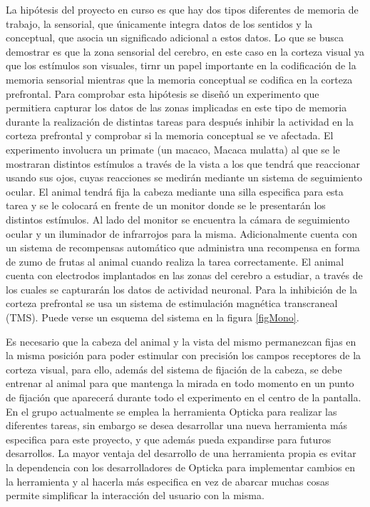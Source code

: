 \documentclass[conference]{IEEEtran}
\begin{document}
La hipótesis del proyecto en curso es que hay dos tipos diferentes de memoria de trabajo, la sensorial, que únicamente integra datos de los sentidos y la conceptual, que asocia un significado adicional a estos datos. Lo que se busca demostrar es que la zona sensorial del cerebro, en este caso en la corteza visual ya que los estímulos son visuales, tirnr un papel importante en la codificación de la memoria sensorial mientras que la memoria conceptual se codifica en la corteza prefrontal.
Para comprobar esta hipótesis se diseñó un experimento que permitiera capturar los datos de las zonas implicadas en este tipo de memoria durante la realización de distintas tareas para después inhibir la actividad en la corteza prefrontal y comprobar si la memoria conceptual se ve afectada.
El experimento involucra un primate (un macaco, Macaca mulatta) al que se le mostraran distintos estímulos a través de la vista a los que tendrá que reaccionar usando sus ojos, cuyas reacciones se medirán mediante un sistema de seguimiento ocular. El animal tendrá fija la cabeza mediante una silla especifica para esta tarea y se le colocará en frente de un monitor donde se le presentarán los distintos estímulos. Al lado del monitor se encuentra la cámara de seguimiento ocular y un iluminador de infrarrojos para la misma. Adicionalmente cuenta con un sistema de recompensas automático que administra una recompensa en forma de zumo de frutas al animal cuando realiza la tarea correctamente. El animal cuenta con electrodos implantados en las zonas del cerebro a estudiar, a través de los cuales se capturarán los datos de actividad neuronal. Para la inhibición de la corteza prefrontal se usa un sistema de estimulación magnética transcraneal (TMS). Puede verse un esquema del sistema en la figura \ref{figMono}.

Es necesario que la cabeza del animal y la vista del mismo permanezcan fijas en la misma posición para poder estimular con precisión los campos receptores de la corteza visual, para ello, además del sistema de fijación de la cabeza, se debe entrenar al animal para que mantenga la mirada en todo momento en un punto de fijación que aparecerá durante todo el experimento en el centro de la pantalla.
En el grupo actualmente se emplea la herramienta Opticka\cite{opticka} para realizar las diferentes tareas, sin embargo se desea desarrollar una nueva herramienta más especifica para este proyecto, y que además pueda expandirse para futuros desarrollos. La mayor ventaja del desarrollo de una herramienta propia es evitar la dependencia con los desarrolladores de Opticka para implementar cambios en la herramienta y al hacerla más especifica en vez de abarcar muchas cosas permite simplificar la interacción del usuario con la misma.
\end{document}

